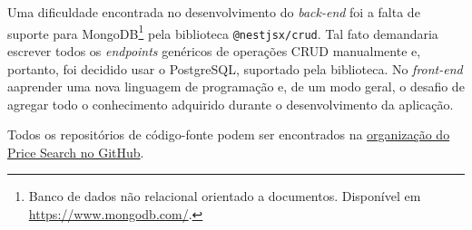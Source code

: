 Uma dificuldade encontrada no desenvolvimento do \textit{back-end} foi a falta de suporte para MongoDB\footnote{Banco de dados não relacional orientado a documentos. Disponível em \url{https://www.mongodb.com/}.} pela biblioteca \texttt{@nestjsx/crud}. Tal fato demandaria escrever todos os \textit{endpoints} genéricos de operações CRUD manualmente e, portanto, foi decidido usar o PostgreSQL, suportado pela biblioteca. No \textit{front-end} aaprender uma nova linguagem de programação e, de um modo geral, o desafio de agregar todo o conhecimento adquirido durante o desenvolvimento da aplicação.

Todos os repositórios de código-fonte podem ser encontrados na \href{https://github.com/price-search}{organização do Price Search no GitHub}.

